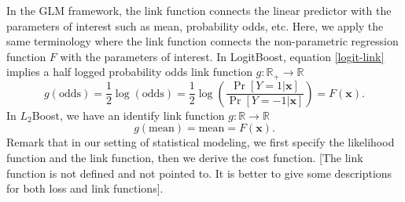 \documentclass[11pt]{article}
\numberwithin{equation}{section}
\def\R{{\mathbb R}}  %
\def\E{{\mathbb E}}  %
\def\bx{\boldsymbol{x}}
\begin{document}
In the GLM framework, the link function connects the linear predictor with the parameters of interest such as mean, probability odds, etc.
Here, we apply the same terminology where the link function connects the non-parametric regression function $F$ with the parameters of interest.
In LogitBoost, equation \eqref{logit-link} implies a half logged probability odds link function $g:\R_+\rightarrow\R$ 
$$g(\text{odds})=\frac{1}{2}\log(\text{odds})=\frac{1}{2}\log\left(\frac{\Pr[Y=1|\bx]}{\Pr[Y=-1|\bx]}\right)=F(\bx).$$
In $L_2$Boost, we have an identify link function $g:\R\rightarrow\R$
$$g(\text{mean})=\text{mean}=F(\bx).$$
Remark that in our setting of statistical modeling, we first specify the likelihood function and the link function, then we derive the cost function.
{\color{blue}[The link function is not defined and not pointed to. It is better to give some descriptions for both loss and link functions].}


\end{document}
